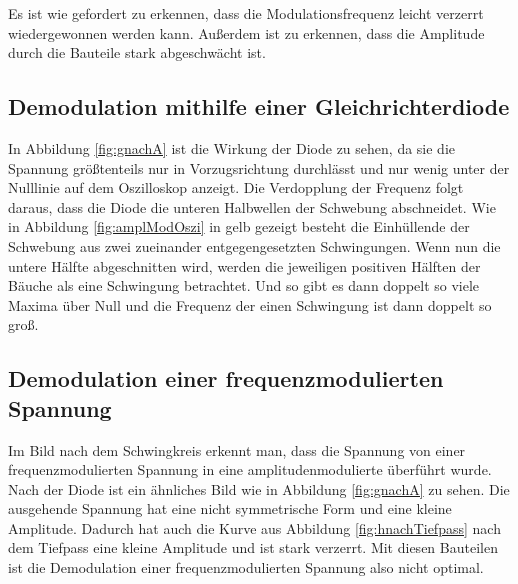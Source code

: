 Es ist wie gefordert zu erkennen, dass die Modulationsfrequenz leicht verzerrt wiedergewonnen werden kann. Außerdem ist zu erkennen, dass die Amplitude durch die Bauteile stark abgeschwächt ist.

\subsection{Demodulation mithilfe einer Gleichrichterdiode}

In Abbildung \ref{fig:gnachA} ist die Wirkung der Diode zu sehen, da sie die Spannung größtenteils nur in Vorzugsrichtung durchlässt und nur wenig unter der Nulllinie auf dem Oszilloskop anzeigt.
Die Verdopplung der Frequenz folgt daraus, dass die Diode die unteren Halbwellen der Schwebung abschneidet. Wie in Abbildung \ref{fig:amplModOszi} in gelb gezeigt besteht die Einhüllende der Schwebung aus zwei zueinander entgegengesetzten Schwingungen. Wenn nun die untere Hälfte abgeschnitten wird, werden die jeweiligen positiven Hälften der Bäuche als eine Schwingung betrachtet. Und so gibt es dann doppelt so viele Maxima über Null und die Frequenz der einen Schwingung ist dann doppelt so groß.


\subsection{Demodulation einer frequenzmodulierten Spannung}

Im Bild nach dem Schwingkreis erkennt man, dass die Spannung von einer frequenzmodulierten Spannung in eine amplitudenmodulierte überführt wurde.
Nach der Diode ist ein ähnliches Bild wie in Abbildung \ref{fig:gnachA} zu sehen. Die ausgehende Spannung hat eine nicht symmetrische Form und eine kleine Amplitude. Dadurch hat auch die Kurve aus Abbildung \ref{fig:hnachTiefpass} nach dem Tiefpass eine kleine Amplitude und ist stark verzerrt. Mit diesen Bauteilen ist die Demodulation einer frequenzmodulierten Spannung also nicht optimal.
